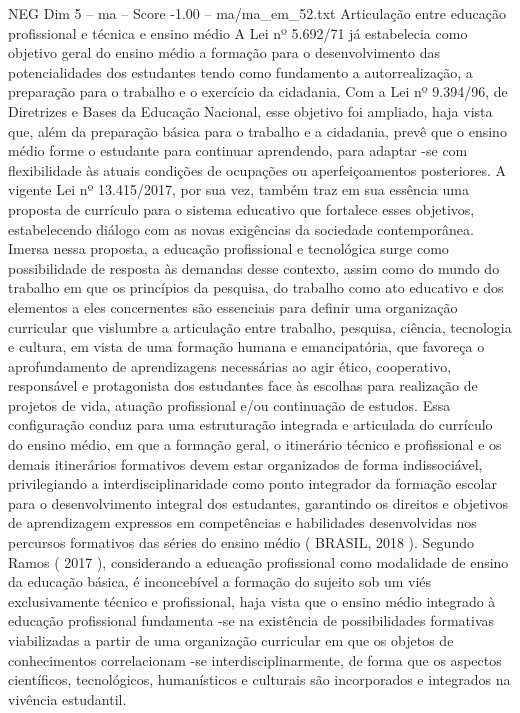 \begin{textsample}{NEG Dim 5 – ma – Score -1.00 – ma/ma\_em\_52.txt}  \label{ex:f5_neg_114}
Articulação entre educação profissional e técnica e ensino médio A Lei nº 5.692/71 já estabelecia como objetivo geral do ensino médio a formação para o desenvolvimento das potencialidades dos estudantes tendo como fundamento a autorrealização, a preparação para o trabalho e o exercício da cidadania.
Com a Lei nº 9.394/96, de Diretrizes e Bases da Educação Nacional, esse objetivo foi ampliado, haja vista que, além da preparação básica para o trabalho e a cidadania, prevê que o ensino médio forme o estudante para continuar aprendendo, para adaptar -se com flexibilidade às atuais condições de ocupações ou aperfeiçoamentos posteriores.
A vigente Lei nº 13.415/2017, por sua vez, também traz em sua essência uma proposta de currículo para o sistema educativo que fortalece esses objetivos, estabelecendo diálogo com as novas exigências da sociedade contemporânea.
Imersa nessa proposta, a educação profissional e tecnológica surge como possibilidade de resposta às demandas desse contexto, assim como do mundo do trabalho em que os princípios da pesquisa, do trabalho como ato educativo e dos elementos a eles concernentes são essenciais para definir uma organização curricular que vislumbre a articulação entre trabalho, pesquisa, ciência, tecnologia e cultura, em vista de uma formação humana e emancipatória, que favoreça o aprofundamento de aprendizagens necessárias ao agir ético, cooperativo, responsável e protagonista dos estudantes face às escolhas para realização de projetos de vida, atuação profissional e/ou continuação de estudos.
Essa configuração conduz para uma estruturação integrada e articulada do currículo do ensino médio, em que a formação geral, o itinerário técnico e profissional e os demais itinerários formativos devem estar organizados de forma indissociável, privilegiando a interdisciplinaridade como ponto integrador da formação escolar para o desenvolvimento integral dos estudantes, garantindo os direitos e objetivos de aprendizagem expressos em competências e habilidades desenvolvidas nos percursos formativos das séries do ensino médio ( BRASIL, 2018 ).
Segundo Ramos ( 2017 ), considerando a educação profissional como modalidade de ensino da educação básica, é inconcebível a formação do sujeito sob um viés exclusivamente técnico e profissional, haja vista que o ensino médio integrado à educação profissional fundamenta -se na existência de possibilidades formativas viabilizadas a partir de uma organização curricular em que os objetos de conhecimentos correlacionam -se interdisciplinarmente, de forma que os aspectos científicos, tecnológicos, humanísticos e culturais são incorporados e integrados na vivência estudantil.

\end{textsample}
